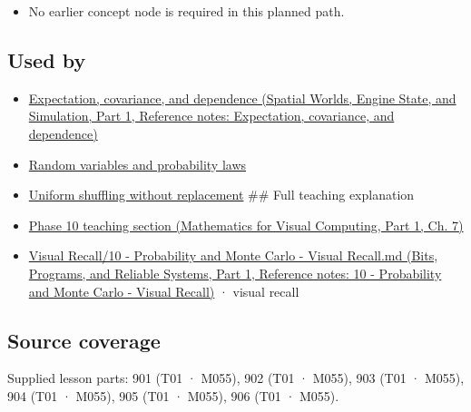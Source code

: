 \begin{itemize}
\tightlist
\item
  No earlier concept node is required in this planned path.
\end{itemize}

\subsection{Used by}\label{appendix-f1ef323f6ed7-used-by}

\hypertarget{appendix-f1ef323f6ed7-used-by}{}

\begin{itemize}
\item
  \href{../05-Spatial-Worlds-Engine-State-and-Simulation-P01/main.pdf\#nameddest=appendix-54c383df9992}{Expectation, covariance, and dependence (Spatial Worlds, Engine State, and Simulation, Part 1, Reference notes: Expectation, covariance, and dependence)}
\item
  \hyperref[appendix-4d0203f7944f]{Random variables and probability laws}
\item
  \hyperref[appendix-184fcc411663]{Uniform shuffling without replacement} \#\# Full teaching explanation
\item
  \href{../02-Mathematics-for-Visual-Computing-P01/main.pdf\#nameddest=02-foundations-ii-ch023-a-probability-model-begins-with-possible-outcomes}{Phase 10 teaching section (Mathematics for Visual Computing, Part 1, Ch. 7)}
\item
  \href{../01-Bits-Programs-and-Reliable-Systems-P01/main.pdf\#nameddest=appendix-cb5af353ef77}{Visual Recall/10 - Probability and Monte Carlo - Visual Recall.md (Bits, Programs, and Reliable Systems, Part 1, Reference notes: 10 - Probability and Monte Carlo - Visual Recall)} · visual recall
\end{itemize}

\subsection{Source coverage}\label{appendix-f1ef323f6ed7-source-coverage}

\hypertarget{appendix-f1ef323f6ed7-source-coverage}{}

Supplied lesson parts: 901 (T01 · M055), 902 (T01 · M055), 903 (T01 · M055), 904 (T01 · M055), 905 (T01 · M055), 906 (T01 · M055).
